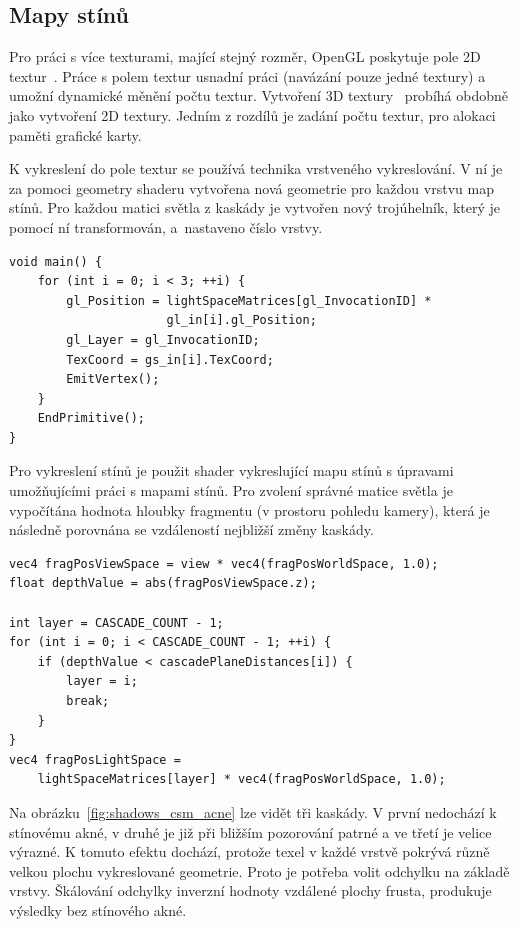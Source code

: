\documentclass[thesis=M,czech]{FITthesis}[2019/12/23]
\begin{document}
\subsection{Mapy stínů}

Pro práci s více texturami, mající stejný rozměr, OpenGL poskytuje pole 2D textur~\cite{kronos_array_texture}. Práce s polem textur usnadní práci (navázání pouze jedné textury) a umožní dynamické měnění počtu textur. Vytvoření 3D textury~\cite{kronos_3d_texture} probíhá obdobně jako vytvoření 2D textury. Jedním z rozdílů je zadání počtu textur, pro alokaci paměti grafické karty.

K vykreslení do pole textur se používá technika vrstveného vykreslování. V ní je za pomoci geometry shaderu vytvořena nová geometrie pro každou vrstvu map stínů. Pro každou matici světla z kaskády je vytvořen nový trojúhelník, který je pomocí ní transformován, a~nastaveno číslo vrstvy.

\begin{verbatim}
void main() {
    for (int i = 0; i < 3; ++i) {
        gl_Position = lightSpaceMatrices[gl_InvocationID] * 
                      gl_in[i].gl_Position;
        gl_Layer = gl_InvocationID;
        TexCoord = gs_in[i].TexCoord;
        EmitVertex();
    }
    EndPrimitive();
}
\end{verbatim}

Pro vykreslení stínů je použit shader vykreslující mapu stínů s úpravami umožňujícími práci s mapami stínů. Pro zvolení správné matice světla je vypočítána hodnota hloubky fragmentu (v prostoru pohledu kamery), která je následně porovnána se vzdáleností nejbližší změny kaskády.

\begin{verbatim}
vec4 fragPosViewSpace = view * vec4(fragPosWorldSpace, 1.0);
float depthValue = abs(fragPosViewSpace.z);

int layer = CASCADE_COUNT - 1;
for (int i = 0; i < CASCADE_COUNT - 1; ++i) {
    if (depthValue < cascadePlaneDistances[i]) {
        layer = i;
        break;
    }
}
vec4 fragPosLightSpace = 
    lightSpaceMatrices[layer] * vec4(fragPosWorldSpace, 1.0);
\end{verbatim}

Na obrázku~\ref{fig:shadows_csm_acne} lze vidět tři kaskády. V první nedochází k stínovému akné, v druhé je již při bližším pozorování patrné a ve třetí je velice výrazné. K tomuto efektu dochází, protože texel v každé vrstvě pokrývá různě velkou plochu vykreslované geometrie. Proto je potřeba volit odchylku na základě vrstvy. Škálování odchylky inverzní hodnoty vzdálené plochy frusta, produkuje výsledky bez stínového akné.
\end{document}
